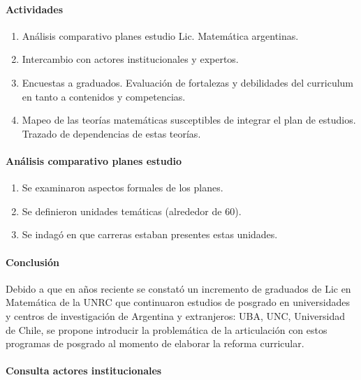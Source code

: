 \documentclass[a4paper,10pt,BCOR10mm,oneside,headsepline]{scrbook}
\begin{document}
\paragraph{Actividades}
\begin{enumerate} 
 \item Análisis comparativo planes estudio Lic. Matemática argentinas.
 \item Intercambio con actores institucionales y expertos.
 \item Encuestas a graduados. Evaluación de fortalezas y debilidades del curriculum en tanto a contenidos y competencias.
 \item Mapeo de las teorías  matemáticas susceptibles de integrar el plan de estudios. Trazado de  dependencias de estas teorías. 
 
\end{enumerate}





\paragraph{ Análisis comparativo planes estudio}
\begin{enumerate} 
  \item Se examinaron aspectos formales de los planes.
 \item Se definieron unidades temáticas (alrededor de 60).
 \item Se indagó en que carreras estaban presentes estas unidades.
\end{enumerate}


\paragraph{Conclusión}
 Debido a que en años reciente se constató un incremento de graduados de Lic en Matemática de la UNRC que continuaron estudios de posgrado en universidades y centros de investigación de Argentina y extranjeros: UBA, UNC, Universidad de Chile, se propone  introducir la problemática de la articulación con estos programas de posgrado  al momento de elaborar la reforma curricular. 







\paragraph{Consulta actores institucionales }
\end{document}
